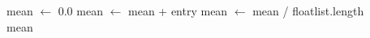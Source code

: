 \begin{algorithmic}[1]
\State mean $\gets$ 0.0
\State mean $\gets$ mean + entry
\EndFor
{}
\State mean $\gets$ mean / floatlist.length
\EndIf \\
\Return mean
\EndFunction
\end{algorithmic}
